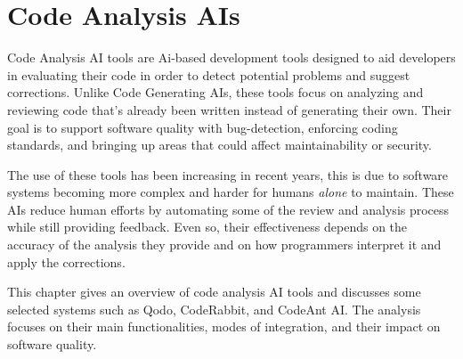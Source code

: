 \chapter{Code Analysis AIs}

Code Analysis AI tools are Ai-based development tools designed to aid developers in evaluating their code in order to detect potential problems and suggest corrections. Unlike Code Generating AIs, these tools focus on analyzing and reviewing code that's already been written instead of generating their own. Their goal is to support software quality with bug-detection, enforcing coding standards, and bringing up areas that could affect maintainability or security.

The use of these tools has been increasing in recent years, this is due to software systems becoming more complex and harder for humans \textit{alone} to maintain. These AIs reduce human efforts by automating some of the review and analysis process while still providing feedback. Even so, their effectiveness depends on the accuracy of the analysis they provide and on how programmers interpret it and apply the corrections.

This chapter gives an overview of code analysis AI tools and discusses some selected systems such as Qodo, CodeRabbit, and CodeAnt AI. The analysis focuses on their main functionalities, modes of integration, and their impact on software quality.

\newpage

\begin{table}[h]
\small
\centering
\caption{Feature-based comparison of selected Code Analysis AIs}
\label{table_4.1}
\end{table}

